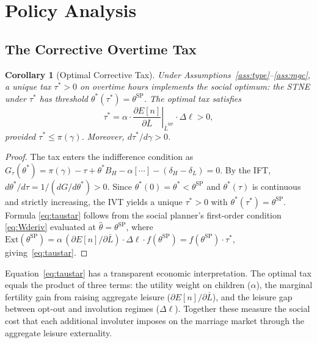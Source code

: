 \documentclass[12pt]{article}
\theoremstyle{plain}
\newtheorem{corollary}{Corollary}
\theoremstyle{definition}
\theoremstyle{remark}
\newcommand{\tstar}{\theta^{*}}
\newcommand{\tsp}{\theta^{\mathrm{SP}}}
\newcommand{\Lbar}{\bar{L}}
\begin{document}
\section{Policy Analysis}
\label{sec:policy}

\subsection{The Corrective Overtime Tax}

\begin{corollary}[Optimal Corrective Tax]
\label{cor:tax}
Under Assumptions~\ref{ass:type}--\ref{ass:mgc}, a unique tax $\tau^{*} > 0$ on
overtime hours implements the social optimum: the STNE under $\tau^{*}$ has threshold
$\tstar(\tau^{*}) = \tsp$.  The optimal tax satisfies
\begin{equation}
  \tau^{*}
  = \alpha \cdot \left.\frac{\partial E[n]}{\partial \Lbar}\right|_{\Lbar^{\mathrm{SP}}}
    \cdot \Delta\ell
  > 0,
  \label{eq:taustar}
\end{equation}
provided $\tau^{*} \leq \pi(\gamma)$.  Moreover, $d\tau^{*}/d\gamma > 0$.
\end{corollary}

\begin{proof}
The tax enters the indifference condition as
$G_{\tau}(\tstar) = \pi(\gamma) - \tau + \tstar B_{H} - \alpha[\cdots] - (\delta_H
- \delta_L) = 0$.  By the IFT, $d\tstar/d\tau = 1/(dG/d\tstar) > 0$.  Since
$\tstar(0) = \tstar < \tsp$ and $\tstar(\tau)$ is continuous and strictly increasing,
the IVT yields a unique $\tau^{*} > 0$ with $\tstar(\tau^{*}) = \tsp$.  Formula
\eqref{eq:taustar} follows from the social planner's first-order condition
\eqref{eq:Wderiv} evaluated at $\hat\theta = \tsp$, where
$\mathrm{Ext}(\tsp) = \alpha\,(\partial E[n]/\partial\Lbar)\cdot\Delta\ell \cdot
f(\tsp) = f(\tsp)\cdot\tau^{*}$, giving~\eqref{eq:taustar}.
\end{proof}

Equation~\eqref{eq:taustar} has a transparent economic interpretation.  The optimal
tax equals the product of three terms: the utility weight on children ($\alpha$), the
marginal fertility gain from raising aggregate leisure ($\partial E[n]/\partial\Lbar$),
and the leisure gap between opt-out and involution regimes ($\Delta\ell$).  Together
these measure the social cost that each additional involuter imposes on the marriage
market through the aggregate leisure externality.
\end{document}
